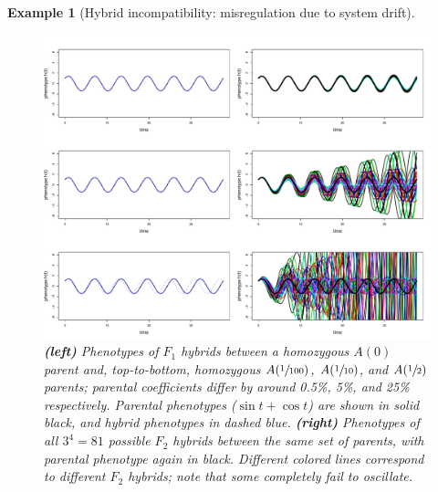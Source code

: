 \documentclass{article}
\newcommand{\1}{\mathbbm{1}}
\newtheorem{example}{Example}
\begin{document}
\begin{example}[Hybrid incompatibility: misregulation due to system drift]
\begin{figure}[H]
  \centering
  \includegraphics[scale=0.5]{examples/f1f2_newplot}
  \caption{
    \textbf{(left)} Phenotypes of $F_1$ hybrids between a homozygous $A(0)$ parent and, 
    top-to-bottom, homozygous $A(\sfrac{1}{100})$, $A(\sfrac{1}{10})$, and $A(\sfrac{1}{2})$ parents;
    parental coefficients differ by around 0.5\%, 5\%, and 25\% respectively.
    Parental phenotypes ($\sin t + \cos t$) are shown in solid black, and hybrid phenotypes in dashed blue.
    \textbf{(right)} Phenotypes of all $3^4 = 81$ possible $F_2$ hybrids between the same set of parents,
    with parental phenotype again in black.
    Different colored lines correspond to different $F_2$ hybrids;
    note that some completely fail to oscillate.
  } \label{fig:hybs}
\end{figure}


\end{example}
\end{document}
